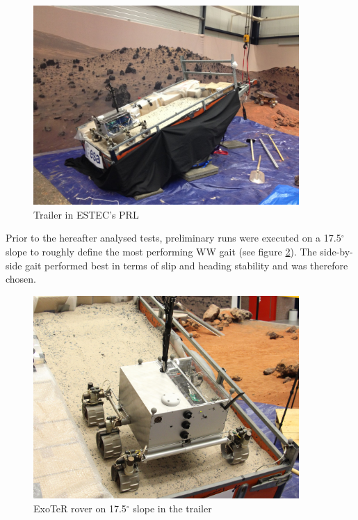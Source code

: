 \documentclass[a4paper,twocolumn]{esapub2005} %
\begin{document}
\begin{figure}[h!]
    \centering
    \includegraphics[width=0.9\textwidth]{trailersetup.jpg}
    \caption{Trailer in ESTEC's PRL}
    \label{fig:trailer}
\end{figure}

Prior to the hereafter analysed tests, preliminary runs were executed on a
17.5$^{\circ}$ slope to roughly define the most performing WW gait (see figure
\ref{fig:Exoslope}).  The side-by-side gait performed best in terms of slip and
heading stability and was therefore chosen. 

\begin{figure}[h!]
    \centering
    \includegraphics[width=0.9\textwidth]{Exoslope.jpg}
    \caption{ExoTeR rover on 17.5$^{\circ}$ slope in the trailer}
    \label{fig:Exoslope}
\end{figure}
\end{document}

